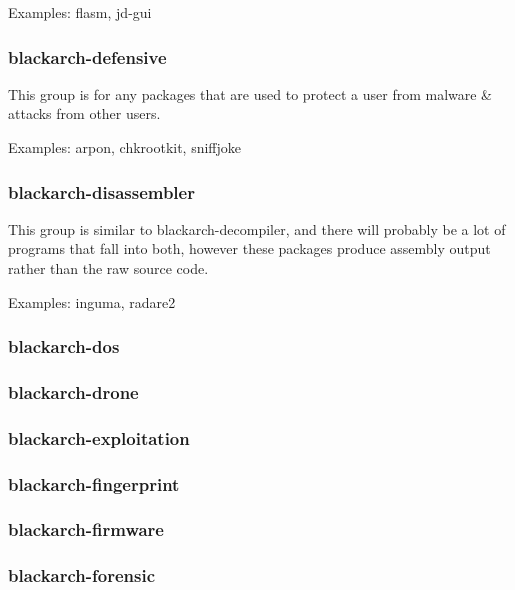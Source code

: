 \documentclass[a4paper, oneside, 11pt]{book}
\begin{document}
Examples: flasm, jd-gui

\subsubsection{blackarch-defensive}

This group is for any packages that are used to protect a user from malware \& attacks from other users.

Examples: arpon, chkrootkit, sniffjoke

\subsubsection{blackarch-disassembler}

This group is similar to blackarch-decompiler, and there will probably be a lot of programs that fall into both, however these packages produce assembly output rather than the raw source code.

Examples: inguma, radare2

\subsubsection{blackarch-dos}



\subsubsection{blackarch-drone}



\subsubsection{blackarch-exploitation}



\subsubsection{blackarch-fingerprint}



\subsubsection{blackarch-firmware}



\subsubsection{blackarch-forensic}
\end{document}
